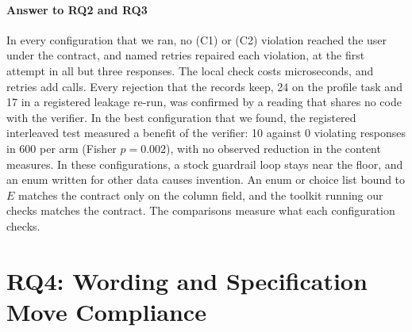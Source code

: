 \documentclass[journal]{IEEEtran}
\begin{document}
\paragraph{Answer to RQ2 and RQ3}
In every configuration that we ran, no (C1) or (C2) violation reached the user
under the contract, and named retries repaired each violation, at the first
attempt in all but three responses. The local check costs microseconds, and
retries add calls. Every rejection that the records keep, 24 on the profile
task and 17 in a registered leakage re-run, was confirmed by a reading that
shares no code with the verifier. In the best configuration that we found, the
registered interleaved test measured a benefit of the verifier: 10 against 0
violating responses in 600 per arm (Fisher $p=0.002$), with no observed
reduction in the content measures. In these configurations, a
stock guardrail loop stays near the floor, and an enum written for other data
causes invention. An enum or choice list bound to $E$ matches the contract
only on the column field, and the toolkit running our checks matches the
contract. The comparisons measure what each configuration checks.

\section{RQ4: Wording and Specification Move Compliance}\label{sec:rq4}
\end{document}
